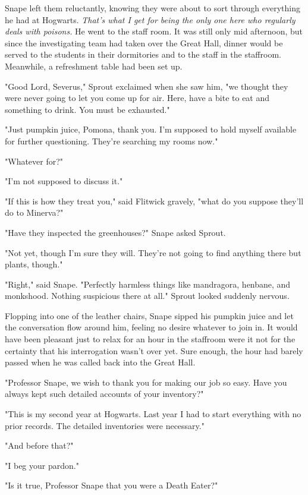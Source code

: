 \documentclass[a4paper,11pt]{article}
\begin{document}
Snape left them reluctantly, knowing they were about to sort through everything he had at Hogwarts. \emph{That's what I get for being the only one here who regularly deals with poisons.} He went to the staff room. It was still only mid afternoon, but since the investigating team had taken over the Great Hall, dinner would be served to the students in their dormitories and to the staff in the staffroom. Meanwhile, a refreshment table had been set up.

"Good Lord, Severus," Sprout exclaimed when she saw him, "we thought they were never going to let you come up for air. Here, have a bite to eat and something to drink. You must be exhausted."

"Just pumpkin juice, Pomona, thank you. I'm supposed to hold myself available for further questioning. They're searching my rooms now."

"Whatever for?"

"I'm not supposed to discuss it."

"If this is how they treat you," said Flitwick gravely, "what do you suppose they'll do to Minerva?"

"Have they inspected the greenhouses?" Snape asked Sprout.

"Not yet, though I'm sure they will. They're not going to find anything there but plants, though."

"Right," said Snape. "Perfectly harmless things like mandragora, henbane, and monkshood. Nothing suspicious there at all." Sprout looked suddenly nervous.

Flopping into one of the leather chairs, Snape sipped his pumpkin juice and let the conversation flow around him, feeling no desire whatever to join in. It would have been pleasant just to relax for an hour in the staffroom were it not for the certainty that his interrogation wasn't over yet. Sure enough, the hour had barely passed when he was called back into the Great Hall.

"Professor Snape, we wish to thank you for making our job so easy. Have you always kept such detailed accounts of your inventory?"

"This is my second year at Hogwarts. Last year I had to start everything with no prior records. The detailed inventories were necessary."

"And before that?"

"I beg your pardon."

"Is it true, Professor Snape that you were a Death Eater?"
\end{document}
